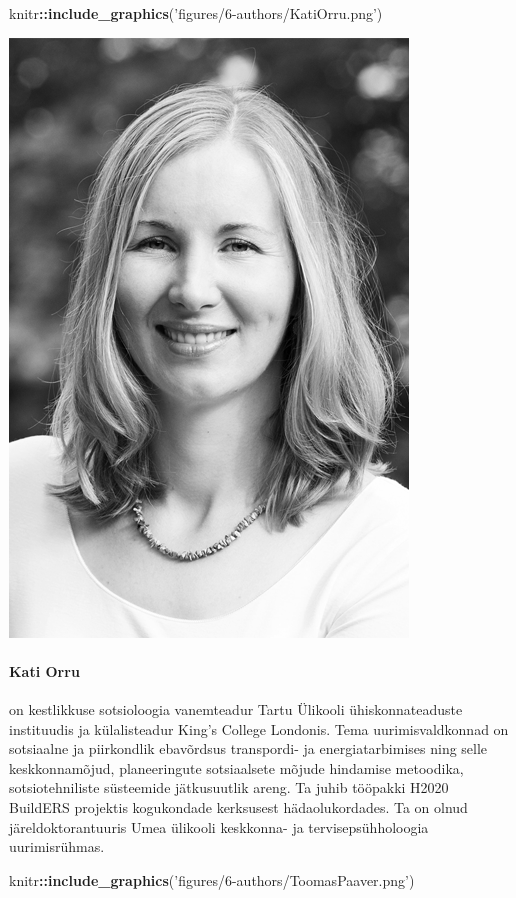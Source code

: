\documentclass[estonian,]{article}
\newenvironment{Shaded}{\begin{snugshade}}{\end{snugshade}}
\newcommand{\KeywordTok}[1]{\textcolor[rgb]{0.13,0.29,0.53}{\textbf{#1}}}
\newcommand{\NormalTok}[1]{#1}
\newcommand{\OperatorTok}[1]{\textcolor[rgb]{0.81,0.36,0.00}{\textbf{#1}}}
\newcommand{\StringTok}[1]{\textcolor[rgb]{0.31,0.60,0.02}{#1}}
\let\oldparagraph\paragraph
\renewcommand{\paragraph}[1]{\oldparagraph{#1}\mbox{}}
\begin{document}
\begin{Shaded}
\begin{Highlighting}[]
\NormalTok{knitr}\OperatorTok{::}\KeywordTok{include_graphics}\NormalTok{(}\StringTok{'figures/6-authors/KatiOrru.png'}\NormalTok{)}
\end{Highlighting}
\end{Shaded}

\begin{flushleft}\includegraphics[width=0.5\linewidth]{figures/6-authors/KatiOrru} \end{flushleft}

\hypertarget{kati-orru}{%
\paragraph{Kati Orru}\label{kati-orru}}

on kestlikkuse sotsioloogia vanemteadur Tartu Ülikooli ühiskonnateaduste instituudis ja külalisteadur King's College Londonis. Tema uurimisvaldkonnad on sotsiaalne ja piirkondlik ebavõrdsus transpordi- ja energiatarbimises ning selle keskkonnamõjud, planeeringute sotsiaalsete mõjude hindamise metoodika, sotsiotehniliste süsteemide jätkusuutlik areng. Ta juhib tööpakki H2020 BuildERS projektis kogukondade kerksusest hädaolukordades. Ta on olnud järeldoktorantuuris Umea ülikooli keskkonna- ja tervisepsühholoogia uurimisrühmas.

\begin{Shaded}
\begin{Highlighting}[]
\NormalTok{knitr}\OperatorTok{::}\KeywordTok{include_graphics}\NormalTok{(}\StringTok{'figures/6-authors/ToomasPaaver.png'}\NormalTok{)}
\end{Highlighting}
\end{Shaded}
\end{document}

